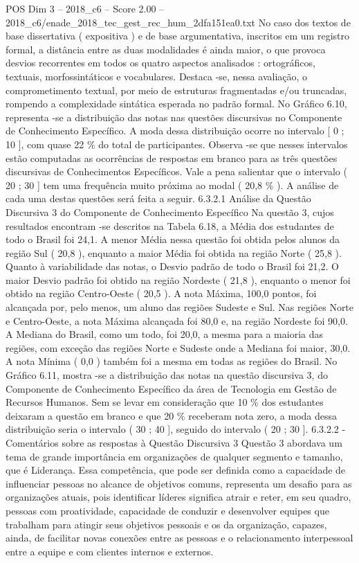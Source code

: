 \begin{textsample}{POS Dim 3 – 2018\_c6 – Score 2.00 – 2018\_c6/enade\_2018\_tec\_gest\_rec\_hum\_2dfa151ea0.txt}
No caso dos textos de base dissertativa ( expositiva ) e de base argumentativa, inscritos em um registro formal, a distância entre as duas modalidades é ainda maior, o que provoca desvios recorrentes em todos os quatro aspectos analisados : ortográficos, textuais, morfossintáticos e vocabulares.
Destaca -se, nessa avaliação, o comprometimento textual, por meio de estruturas fragmentadas e/ou truncadas, rompendo a complexidade sintática esperada no padrão formal.
No Gráfico 6.10, representa -se a distribuição das notas nas questões discursivas no Componente de Conhecimento Específico.
A moda dessa distribuição ocorre no intervalo [ 0 ; 10 ], com quase 22 \% do total de participantes.
Observa -se que nesses intervalos estão computadas as ocorrências de respostas em branco para as três questões discursivas de Conhecimentos Específicos.
Vale a pena salientar que o intervalo ( 20 ; 30 ] tem uma frequência muito próxima ao modal ( 20,8 \% ).
A análise de cada uma destas questões será feita a seguir. 6.3.2.1 Análise da Questão Discursiva 3 do Componente de Conhecimento Específico Na questão 3, cujos resultados encontram -se descritos na Tabela 6.18, a Média dos estudantes de todo o Brasil foi 24,1.
A menor Média nessa questão foi obtida pelos alunos da região Sul ( 20,8 ), enquanto a maior Média foi obtida na região Norte ( 25,8 ).
Quanto à variabilidade das notas, o Desvio padrão de todo o Brasil foi 21,2.
O maior Desvio padrão foi obtido na região Nordeste ( 21,8 ), enquanto o menor foi obtido na região Centro-Oeste ( 20,5 ).
A nota Máxima, 100,0 pontos, foi alcançada por, pelo menos, um aluno das regiões Sudeste e Sul.
Nas regiões Norte e Centro-Oeste, a nota Máxima alcançada foi 80,0 e, na região Nordeste foi 90,0.
A Mediana do Brasil, como um todo, foi 20,0, a mesma para a maioria das regiões, com exceção das regiões Norte e Sudeste onde a Mediana foi maior, 30,0.
A nota Mínima ( 0,0 ) também foi a mesma em todas as regiões do Brasil.
No Gráfico 6.11, mostra -se a distribuição das notas na questão discursiva 3, do Componente de Conhecimento Específico da área de Tecnologia em Gestão de Recursos Humanos.
Sem se levar em consideração que 10 \% dos estudantes deixaram a questão em branco e que 20 \% receberam nota zero, a moda dessa distribuição seria o intervalo ( 30 ; 40 ], seguido do intervalo ( 20 ; 30 ]. 6.3.2.2 - Comentários sobre as respostas à Questão Discursiva 3 Questão 3 abordava um tema de grande importância em organizações de qualquer segmento e tamanho, que é Liderança.
Essa competência, que pode ser definida como a capacidade de influenciar pessoas no alcance de objetivos comuns, representa um desafio para as organizações atuais, pois identificar líderes significa atrair e reter, em seu quadro, pessoas com proatividade, capacidade de conduzir e desenvolver equipes que trabalham para atingir seus objetivos pessoais e os da organização, capazes, ainda, de facilitar novas conexões entre as pessoas e o relacionamento interpessoal entre a equipe e com clientes internos e externos.

\end{textsample}
